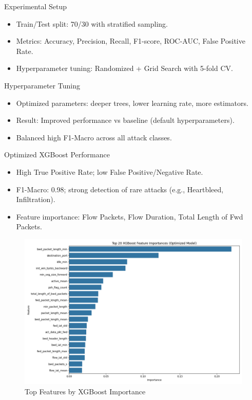\documentclass{beamer}
\begin{document}
\begin{frame}{Experimental Setup}
\begin{itemize}
    \item Train/Test split: 70/30 with stratified sampling.
    \item Metrics: Accuracy, Precision, Recall, F1-score, ROC-AUC, False Positive Rate.
    \item Hyperparameter tuning: Randomized + Grid Search with 5-fold CV.
\end{itemize}
\end{frame}

\begin{frame}{Hyperparameter Tuning}
\begin{itemize}
    \item Optimized parameters: deeper trees, lower learning rate, more estimators.
    \item Result: Improved performance vs baseline (default hyperparameters).
    \item Balanced high F1-Macro across all attack classes.
\end{itemize}
\end{frame}

\begin{frame}{Optimized XGBoost Performance}
\begin{itemize}
    \item High True Positive Rate; low False Positive/Negative Rate.
    \item F1-Macro: 0.98; strong detection of rare attacks (e.g., Heartbleed, Infiltration).
    \item Feature importance: Flow Packets, Flow Duration, Total Length of Fwd Packets.
\end{itemize}
\begin{figure}
    \includegraphics[width=0.7\linewidth]{assets/figures/results/xgboost_feature_importance.png}
    \caption{Top Features by XGBoost Importance}
\end{figure}
\end{frame}
\end{document}
